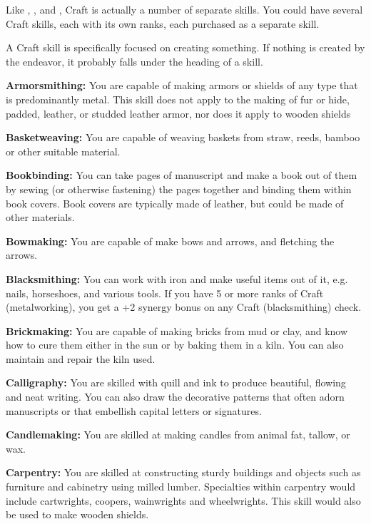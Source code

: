 
Like , , and , Craft is actually a number of separate skills. You could have several Craft skills, each with its own ranks, each purchased as a separate skill.

A Craft skill is specifically focused on creating something. If nothing is created by the endeavor, it probably falls under the heading of a  skill.

\begin{itemize*}
	\item \textbf{Armorsmithing:} You are capable of making armors or shields of any type that is predominantly metal. This skill does not apply to the making of fur or hide, padded, leather, or studded leather armor, nor does it apply to wooden shields
	\item \textbf{Basketweaving:} You are capable of weaving baskets from straw, reeds, bamboo or other suitable material.
	\item \textbf{Bookbinding:} You can take pages of manuscript and make a book out of them by sewing (or otherwise fastening) the pages together and binding them within book covers. Book covers are typically made of leather, but could be made of other materials.
	\item \textbf{Bowmaking:} You are capable of make bows and arrows, and fletching the arrows.
	\item \textbf{Blacksmithing:} You can work with iron and make useful items out of it, e.g. nails, horseshoes, and various tools. If you have 5 or more ranks of Craft (metalworking), you get a +2 synergy bonus on any Craft (blacksmithing) check.
	\item \textbf{Brickmaking:} You are capable of making bricks from mud or clay, and know how to cure them either in the sun or by baking them in a kiln. You can also maintain and repair the kiln used.
	\item \textbf{Calligraphy:} You are skilled with quill and ink to produce beautiful, flowing and neat writing. You can also draw the decorative patterns that often adorn manuscripts or that embellish capital letters or signatures.
	\item \textbf{Candlemaking:} You are skilled at making candles from animal fat, tallow, or wax.
	\item \textbf{Carpentry:} You are skilled at constructing sturdy buildings and objects such as furniture and cabinetry using milled lumber. Specialties within carpentry would include cartwrights, coopers, wainwrights and wheelwrights. This skill would also be used to make wooden shields.

\end{itemize*}
